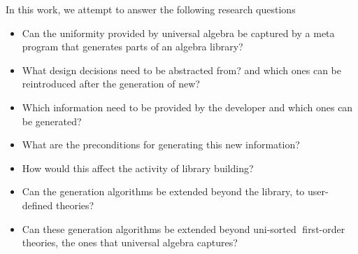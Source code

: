 


In this work, we attempt to answer the following research questions 
\begin{itemize}
    \item Can the uniformity provided by universal algebra be captured by a meta program that generates parts of an algebra library?
    \item What design decisions need to be abstracted from? and which ones can be reintroduced after the generation of new?
    \item Which information need to be provided by the developer and which ones can be generated? 
    \item What are the preconditions for generating this new information? 
    \item How would this affect the activity of library building?
    \item Can the generation algorithms be extended beyond the library, to user-defined theories?
    \item Can these generation algorithms be extended beyond uni-sorted first-order theories, the ones that universal algebra captures? 
\end{itemize}

